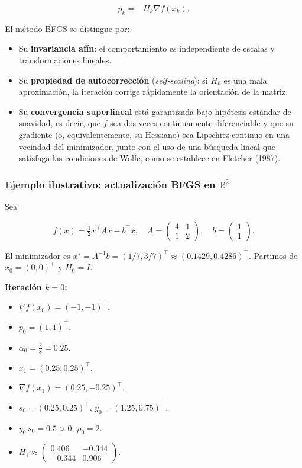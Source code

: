\documentclass[
  spanish,
  us-letterpaper,
  DIV=11,
  numbers=noendperiod]{scrreprt}
\providecommand{\tightlist}{%
  \setlength{\itemsep}{0pt}\setlength{\parskip}{0pt}}
\numberwithin{equation}{section}
\begin{document}
\[
p_k = -H_k \nabla f(x_k).
\]

El método BFGS se distingue por:

\begin{itemize}
\tightlist
\item
  Su \textbf{invariancia afín}: el comportamiento es independiente de
  escalas y transformaciones lineales.
\item
  Su \textbf{propiedad de autocorrección} (\emph{self-scaling}): si
  \(H_k\) es una mala aproximación, la iteración corrige rápidamente la
  orientación de la matriz.
\item
  Su \textbf{convergencia superlineal} está garantizada bajo hipótesis
  estándar de suavidad, es decir, que \(f\) sea dos veces continuamente
  diferenciable y que su gradiente (o, equivalentemente, su Hessiano)
  sea Lipschitz continuo en una vecindad del minimizador, junto con el
  uso de una búsqueda lineal que satisfaga las condiciones de Wolfe,
  como se establece en Fletcher (1987).
\end{itemize}

\subsubsection{\texorpdfstring{Ejemplo ilustrativo: actualización BFGS
en
\(\mathbb{R}^2\)}{Ejemplo ilustrativo: actualización BFGS en \textbackslash mathbb\{R\}\^{}2}}\label{ejemplo-ilustrativo-actualizaciuxf3n-bfgs-en-mathbbr2}

Sea

\[
f(x) = \tfrac{1}{2} x^\top A x - b^\top x, \quad
A = \begin{pmatrix} 4 & 1 \\ 1 & 2 \end{pmatrix}, \quad
b = \begin{pmatrix} 1 \\ 1 \end{pmatrix}.
\]

El minimizador es
\(x^\star = A^{-1}b = (1/7, 3/7)^\top \approx (0.1429, 0.4286)^\top\).
Partimos de \(x_0 = (0,0)^\top\) y \(H_0 = I\).

\textbf{Iteración \(k = 0\):}

\begin{itemize}
\tightlist
\item
  \(\nabla f(x_0) = (-1, -1)^\top\).
\item
  \(p_0 = (1,1)^\top\).
\item
  \(\alpha_0 = \frac{2}{8} = 0.25\).
\item
  \(x_1 = (0.25, 0.25)^\top\).
\item
  \(\nabla f(x_1) = (0.25, -0.25)^\top\).
\item
  \(s_0 = (0.25, 0.25)^\top\), \(y_0 = (1.25, 0.75)^\top\).
\item
  \(y_0^\top s_0 = 0.5 > 0\), \(\rho_0 = 2\).
\item
  \(H_1 \approx \begin{pmatrix} 0.406 & -0.344 \\ -0.344 & 0.906 \end{pmatrix}\).
\end{itemize}
\end{document}
